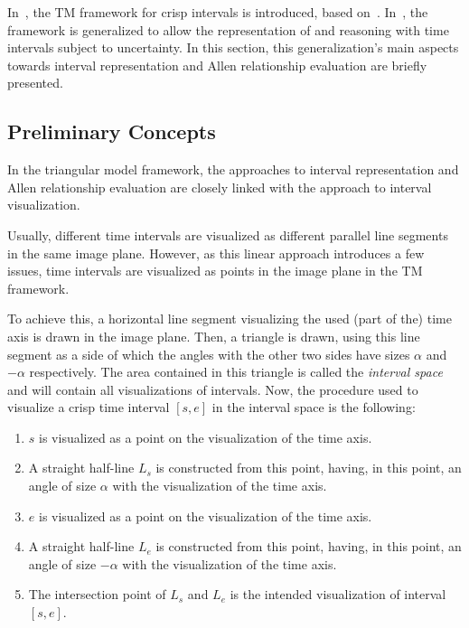In~\cite{Weghe2007}, the TM framework for crisp intervals is introduced, based on~\cite{Kulpa1997}. In~\cite{DeTre2012}, the framework is generalized to allow the representation of and reasoning with time intervals subject to uncertainty. In this section, this generalization's main aspects towards interval representation and Allen relationship evaluation are briefly presented. 

\subsection{\label{subsec:tm-preliminaries}Preliminary Concepts}
In the triangular model framework, the approaches to interval representation and Allen relationship evaluation are closely linked with the approach to interval visualization.

Usually, different time intervals are visualized as different parallel line segments in the same image plane. However, as this linear approach introduces a few issues, time intervals are visualized as points in the image plane in the TM framework.

To achieve this, a horizontal line segment visualizing the used (part of the) time axis is drawn in the image plane. Then, a triangle is drawn, using this line segment as a side of which the angles with the other two sides have sizes $\alpha$ and $-\alpha$ respectively. The area contained in this triangle is called the \emph{interval space} and will contain all visualizations of intervals. Now, the procedure used to visualize a crisp time interval $\left[s, e\right]$ in the interval space is the following:

\begin{enumerate}
	\item $s$ is visualized as a point on the visualization of the time axis.
	\item A straight half-line $L_s$ is constructed from this point, having, in this point, an angle of size $\alpha$ with the visualization of the time axis.
	\item $e$ is visualized as a point on the visualization of the time axis.
	\item A straight half-line $L_e$ is constructed from this point, having, in this point, an angle of size $-\alpha$ with the visualization of the time axis.
	\item The intersection point of $L_s$ and $L_e$ is the intended visualization of interval $\left[s, e\right]$.
\end{enumerate}

